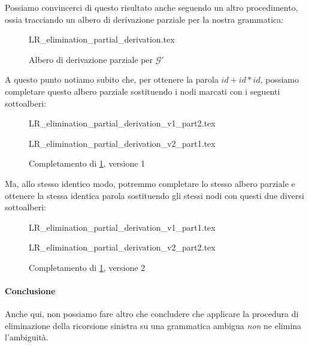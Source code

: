 \documentclass[class=book, crop=false, oneside, 12pt]{standalone}
\begin{document}
Possiamo convincerci di questo risultato anche seguendo un altro procedimento, ossia tracciando un albero di derivazione parziale per la nostra grammatica:
\begin{figure}[H]
    \centering
    {LR_elimination_partial_derivation.tex}
    \caption{Albero di derivazione parziale per \(\mathcal{G'}\)}
    \label{fxness-lrremove- ambiguity_1}
\end{figure}
A questo punto notiamo subito che, per ottenere la parola \(id + id * id\), possiamo completare questo albero parziale sostituendo i nodi marcati con i seguenti sottoalberi:
\begin{figure}[H]
    \begin{minipage}[b]{0.4\textwidth}
        \centering
        {LR_elimination_partial_derivation_v1_part2.tex}
        \subcaption{}
        \label{fxness-lrremove- ambiguity_2_2}
    \end{minipage}
    \hfill
    \begin{minipage}[b]{0.4\textwidth}
        \centering
        {LR_elimination_partial_derivation_v2_part1.tex}
        \subcaption{}
        \label{fxness-lrremove- ambiguity_2_1}
    \end{minipage}
    \caption{Completamento di \ref{fxness-lrremove- ambiguity_1}, versione 1}
    \label{fxness-lrremove- ambiguity_2}
\end{figure}
Ma, allo stesso identico modo, potremmo completare lo stesso albero parziale e ottenere la stessa identica parola sostituendo gli stessi nodi con questi due diversi sottoalberi:
\begin{figure}[H]
    \begin{minipage}[b]{0.4\textwidth}
        \centering
        {LR_elimination_partial_derivation_v1_part1.tex}
        \subcaption{}
        \label{fxness-lrremove- ambiguity_3_1}
    \end{minipage}
    \hfill
    \begin{minipage}[b]{0.4\textwidth}
        \centering
        {LR_elimination_partial_derivation_v2_part2.tex}
        \subcaption{}
        \label{fxness-lrremove- ambiguity_3_2}
    \end{minipage}
    \caption{Completamento di \ref{fxness-lrremove- ambiguity_1}, versione 2}
    \label{fxness-lrremove- ambiguity_3}
\end{figure}

\paragraph{Conclusione}
Anche qui, non possiamo fare altro che concludere che applicare la procedura di eliminazione della ricorsione sinistra su una grammatica ambigua \emph{non} ne elimina l'ambiguità.
\end{document}
